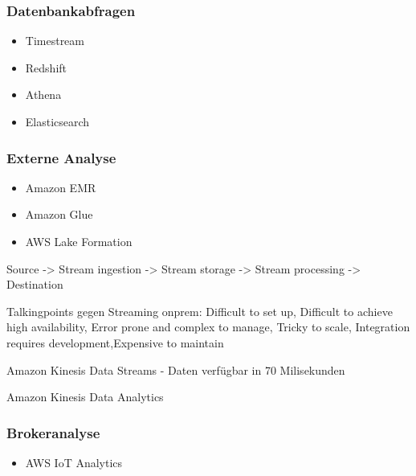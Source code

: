 \subsubsection{Datenbankabfragen}
\begin{itemize}
\item Timestream
\item Redshift
\item Athena
\item Elasticsearch
\end{itemize}

\subsubsection{Externe Analyse}
\begin{itemize}
\item Amazon EMR
\item Amazon Glue
\item AWS Lake Formation
\end{itemize}




Source -> Stream ingestion -> Stream storage -> Stream processing -> Destination

Talkingpoints gegen Streaming onprem:
Difficult to set up, Difficult to achieve high availability,
Error prone and complex to manage,
Tricky to scale, Integration requires development,Expensive to maintain

Amazon Kinesis Data Streams - Daten verfügbar in 70 Milisekunden



Amazon Kinesis Data Analytics


\subsubsection{Brokeranalyse}

\begin{itemize}
\item AWS IoT Analytics
\end{itemize}